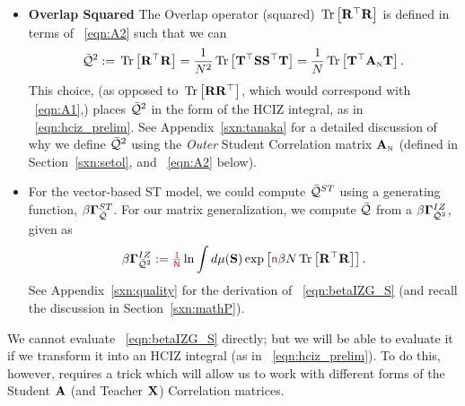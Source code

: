 \begin{itemize}
\item
 \textbf{Overlap Squared}
 The Overlap operator (squared)  $\mbox{}\operatorname{Tr}\left[\mathbf{R}^{\top}\mathbf{R}\right]$ is defined  in terms of \EQN~\ref{eqn:A2} such
 that we can 
\begin{align}
  \label{eqn:TraceR2withA2}
  \bar{\mathcal{Q}}^{2} :=\mbox{}\operatorname{Tr}\left[\mathbf{R}^{\top}\mathbf{R}\right]
  =\frac{1}{N^{2}}\mbox{}\operatorname{Tr}\left[{\mathbf{T}}^{\top}{\mathbf{S}}{\mathbf{S}}^{\top}{\mathbf{T}}\right]
  =\frac{1}{N}\mbox{}\operatorname{Tr}\left[{\mathbf{T}}^{\top}{\mathbf{A}}_{\text{\tiny N}}{\mathbf{T}}\right]  .
\end{align}
This choice, (as opposed to $\mbox{}\operatorname{Tr}\left[\mathbf{R}\mathbf{R}^{\top}\right]$, which would correspond with \EQN~\ref{eqn:A1},) places $\bar{\mathcal{Q}}^{2}$ in the form of the HCIZ integral, as in \EQN~\ref{eqn:hciz_prelim}.
See Appendix~\ref{sxn:tanaka} for a detailed discussion of why we define $\bar{\mathcal{Q}}^{2}$ using the \emph{Outer} Student Correlation matrix ${\mathbf{A}}_{\text{\tiny N}}$ (defined in Section~\ref{sxn:setol}, and  \EQN~\ref{eqn:A2} below).
\item
 \textbf{\GeneratingFunction}
For the vector-based ST model, we could compute $\bar{\mathcal{Q}}^{ST}$ using a generating function, $\beta\mathbf{\Gamma}^{ST}_{\bar{\mathcal{Q}}}$.
For our matrix generalization, we compute $\bar{\mathcal{Q}}$ from a \emph{\LayerQualitySquared \GeneratingFunction} $\beta\mathbf{\Gamma}^{IZ}_{\bar{\mathcal{Q}}^{2}}$, given as
\begin{align}
  \label{eqn:betaIZG_S}
  \beta\mathbf{\Gamma}^{IZ}_{\bar{\mathcal{Q}}^{2}}:=  {\color{red}\sf{\tfrac{1}{N}}}\ln \int d\mu({\mathbf{S}}) \exp\left[{\color{red}\sf{n}}\beta N\mbox{}\operatorname{Tr}\left[\mathbf{R}^{\top}\mathbf{R}\right]\right] .
\end{align}
See Appendix~\ref{sxn:quality} for the derivation of \EQN~\ref{eqn:betaIZG_S} (and recall the discussion in Section~\ref{sxn:mathP}). 


\end{itemize}
%

We cannot evaluate \EQN~\ref{eqn:betaIZG_S} directly; but we will be able to evaluate it if we transform it into an HCIZ integral (as in \EQN~\ref{eqn:hciz_prelim}). To do this, however, requires a trick which will allow us to work with different forms of the Student $\mathbf{A}$ (and Teacher $\mathbf{X}$) Correlation matrices.



